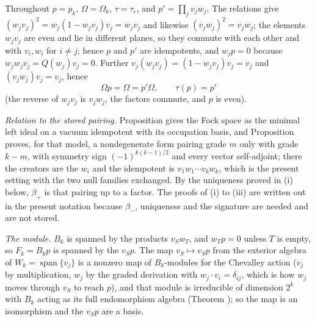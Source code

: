 Throughout $p = p_{k}$, $\Omega = \Omega_{k}$, $\tau = \tau_{\epsilon}$, and $p' = \prod_{j}v_{j}w_{j}$. The relations give $(w_{j}v_{j})^{2} = w_{j}(1 - w_{j}v_{j})v_{j} = w_{j}v_{j}$ and likewise $(v_{j}w_{j})^{2} = v_{j}w_{j}$; the elements $w_{j}v_{j}$ are even and lie in different planes, so they commute with each other and with $v_{i}, w_{i}$ for $i \ne j$; hence $p$ and $p'$ are idempotents, and $w_{j}p = 0$ because $w_{j}w_{j}v_{j} = Q(w_{j})v_{j} = 0$. Further $v_{j}(w_{j}v_{j}) = (1 - w_{j}v_{j})v_{j} = v_{j}$ and $(v_{j}w_{j})v_{j} = v_{j}$, hence
\[
\Omega p = \Omega = p'\Omega, \qquad \tau(p) = p'
\]
(the reverse of $w_{j}v_{j}$ is $v_{j}w_{j}$, the factors commute, and $p$ is even).

\emph{Relation to the stored pairing.} Proposition  gives the Fock space as the minimal left ideal on a vacuum idempotent with its occupation basis, and Proposition  proves, for that model, a nondegenerate form pairing grade $m$ only with grade $k - m$, with symmetry sign $(-1)^{k(k-1)/2}$ and every vector self-adjoint; there the creators are the $w_{i}$ and the idempotent is $v_{1}w_{1}\cdots v_{k}w_{k}$, which is the present setting with the two null families exchanged. By the uniqueness proved in (i) below, $\beta_{+}$ is that pairing up to a factor. The proofs of (i) to (iii) are written out in the present notation because $\beta_{-}$, uniqueness and the signature are needed and are not stored.

\emph{The module.} $B_{k}$ is spanned by the products $v_{S}w_{T}$, and $w_{T}p = 0$ unless $T$ is empty, so $F_{k} = B_{k}p$ is spanned by the $v_{S}p$. The map $v_{S} \mapsto v_{S}p$ from the exterior algebra of $W_{k} = \operatorname{span}\{v_{j}\}$ is a nonzero map of $B_{k}$-modules for the Chevalley action ($v_{j}$ by multiplication, $w_{j}$ by the graded derivation with $w_{j}\cdot v_{i} = \delta_{ij}$, which is how $w_{j}$ moves through $v_{S}$ to reach $p$), and that module is irreducible of dimension $2^{k}$ with $B_{k}$ acting as its full endomorphism algebra (Theorem ); so the map is an isomorphism and the $v_{S}p$ are a basis.

